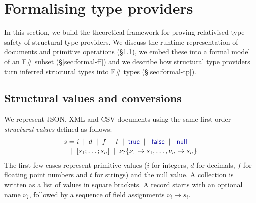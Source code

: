 \documentclass[10pt,preprint,blind,clearpagebib]{sigplanconf}
\newcommand{\kvd}[1]{\textnormal{\textcolor{kvdclr}{\sffamily #1}}}
\newcommand{\lsep}[0]{\;\; | \;\;}
\newcommand{\narrow}[1]{\hspace{-0.7em} #1 \hspace{-0.7em}}
\begin{document}
% 
%

\section{Formalising type providers}
\label{sec:formal}

In this section, we build the theoretical framework for proving relativised type safety of 
structural type providers. We discuss the runtime representation of documents and 
primitive operations (\S\ref{sec:formal-convert}), we embed these into a formal model of an F\# 
subset (\S\ref{sec:formal-ff}) and we describe how structural type providers turn
inferred structural types into F\# types (\S\ref{sec:formal-tp}).


\subsection{Structural values and conversions}
\label{sec:formal-convert}

We represent JSON, XML and CSV documents using the same first-order \emph{structural values} defined
as follows:
%
\begin{equation*}
\begin{array}{lcl}
 s &\narrow{=}& i \lsep d \lsep f \lsep t \lsep \kvd{true} \lsep \kvd{false} \lsep \kvd{null} \\[0.1em]
   &\narrow{|}& [s_1; \ldots; s_n] \lsep \nu_?\{ \nu_1 \mapsto s_1, \ldots, \nu_n \mapsto s_n \}
\end{array}
\end{equation*}
%
The first few cases represent primitive values ($i$ for integers, $d$ for decimals, $f$ for floating
point numbers and $t$ for strings) and the \kvd{null} value. A collection is written as a 
list of values in square brackets. A record starts with an optional name $\nu_?$, followed by a 
sequence of field assignments $\nu_i \mapsto s_i$.
\end{document}
